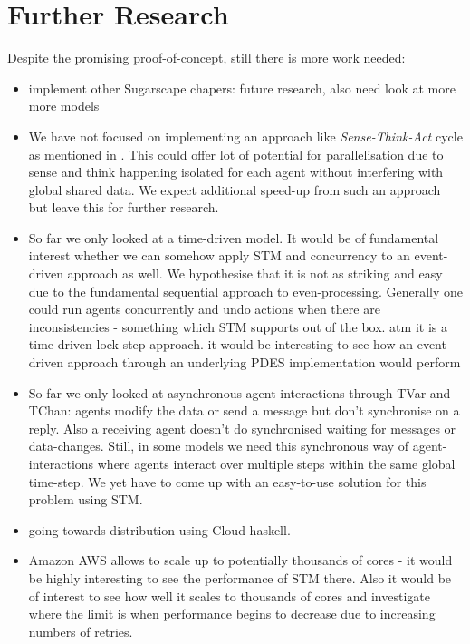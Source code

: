 \section{Further Research}
Despite the promising proof-of-concept, still there is more work needed:

\begin{itemize}
	\item implement other Sugarscape chapers: future research, also need look at more more models
	\item We have not focused on implementing an approach like \textit{Sense-Think-Act} cycle as mentioned in \cite{xiao_survey_2018}. This could offer lot of potential for parallelisation due to sense and think happening isolated for each agent without interfering with global shared data. We expect additional speed-up from such an approach but leave this for further research.
	\item So far we only looked at a time-driven model. It would be of fundamental interest whether we can somehow apply STM and concurrency to an event-driven approach as well. We hypothesise that it is not as striking and easy due to the fundamental sequential approach to even-processing. Generally one could run agents concurrently and undo actions when there are inconsistencies - something which STM supports out of the box. atm it is a time-driven lock-step approach. it would be interesting to see how an event-driven approach through an underlying PDES implementation would perform
	\item So far we only looked at asynchronous agent-interactions through TVar and TChan: agents modify the data or send a message but don't synchronise on a reply. Also a receiving agent doesn't do synchronised waiting for messages or data-changes. Still, in some models we need this synchronous way of agent-interactions where agents interact over multiple steps within the same global time-step. We yet have to come up with an easy-to-use solution for this problem using STM.
	\item going towards distribution using Cloud haskell.
	\item Amazon AWS allows to scale up to potentially thousands of cores - it would be highly interesting to see the performance of STM there. Also it would be of interest to see how well it scales to thousands of cores and investigate where the limit is when performance begins to decrease due to increasing numbers of retries.
\end{itemize}
